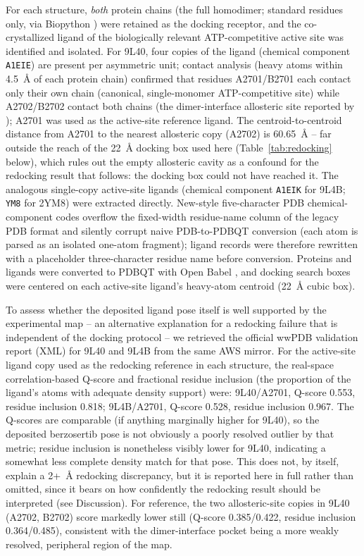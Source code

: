 \documentclass[11pt]{article}
\begin{document}
For each structure, \emph{both} protein chains (the full homodimer; standard
residues only, via Biopython \citep{cock2009}) were retained as the docking
receptor, and the co-crystallized ligand of the biologically relevant
ATP-competitive active site was identified and isolated. For 9L40, four
copies of the ligand (chemical component \texttt{A1EIE}) are present per
asymmetric unit; contact analysis (heavy atoms within 4.5~{\AA} of each
protein chain) confirmed that residues A2701/B2701 each contact only their
own chain (canonical, single-monomer ATP-competitive site) while
A2702/B2702 contact both chains (the dimer-interface allosteric site
reported by \citet{wang2025}); A2701 was used as the active-site reference
ligand. The centroid-to-centroid distance from A2701 to the nearest
allosteric copy (A2702) is 60.65~{\AA} -- far outside the reach of the
22~{\AA} docking box used here (Table~\ref{tab:redocking} below), which
rules out the empty allosteric cavity as a confound for the redocking result
that follows: the docking box could not have reached it. The analogous
single-copy active-site ligands (chemical component \texttt{A1EIK} for
9L4B; \texttt{YM8} for 2YM8) were extracted directly. New-style
five-character PDB chemical-component codes overflow the fixed-width
residue-name column of the legacy PDB format and silently corrupt naive
PDB-to-PDBQT conversion (each atom is parsed as an isolated one-atom
fragment); ligand records were therefore rewritten with a placeholder
three-character residue name before conversion. Proteins and ligands were
converted to PDBQT with Open Babel \citep{oboyle2011}, and docking search
boxes were centered on each active-site ligand's heavy-atom centroid
(22~{\AA} cubic box).

To assess whether the deposited ligand pose itself is well supported by the
experimental map -- an alternative explanation for a redocking failure that
is independent of the docking protocol -- we retrieved the official wwPDB
validation report (XML) for 9L40 and 9L4B from the same AWS mirror. For the
active-site ligand copy used as the redocking reference in each structure,
the real-space correlation-based Q-score \citep{pintilie2020} and fractional
residue inclusion (the proportion of the ligand's atoms with adequate
density support) were: 9L40/A2701, Q-score 0.553, residue inclusion 0.818;
9L4B/A2701, Q-score 0.528, residue inclusion 0.967. The Q-scores are
comparable (if anything marginally higher for 9L40), so the deposited
berzosertib pose is not obviously a poorly resolved outlier by that metric;
residue inclusion is nonetheless visibly lower for 9L40, indicating a
somewhat less complete density match for that pose. This does not, by
itself, explain a 2+~{\AA} redocking discrepancy, but it is reported here
in full rather than omitted, since it bears on how confidently the
redocking result should be interpreted (see Discussion). For reference, the
two allosteric-site copies in 9L40 (A2702, B2702) score
markedly lower still (Q-score 0.385/0.422, residue inclusion 0.364/0.485),
consistent with the dimer-interface pocket being a more weakly resolved,
peripheral region of the map.
\end{document}
